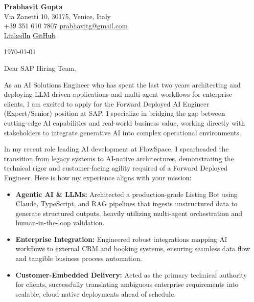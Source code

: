 \documentclass[11pt,a4paper]{article}
\begin{document}
\begin{center}
    {\huge \textbf{Prabhavit Gupta}} \\
    \vspace{4pt}
    Via Zanetti 10, 30175, Venice, Italy \\
    +39 351 610 7807 \textbar{} \href{mailto:prabhavitg@gmail.com}{prabhavitg@gmail.com} \\
    \href{https://www.linkedin.com/in/prabhavit/}{LinkedIn} \textbar{} \href{https://github.com/prab-gupta}{GitHub}
\end{center}

\vspace{20pt}

\noindent \today

\vspace{10pt}

\noindent Dear SAP Hiring Team,

\vspace{10pt}

\noindent As an AI Solutions Engineer who has spent the last two years architecting and deploying LLM-driven applications and multi-agent workflows for enterprise clients, I am excited to apply for the Forward Deployed AI Engineer (Expert/Senior) position at SAP. I specialize in bridging the gap between cutting-edge AI capabilities and real-world business value, working directly with stakeholders to integrate generative AI into complex operational environments.

\noindent In my recent role leading AI development at FlowSpace, I spearheaded the transition from legacy systems to AI-native architectures, demonstrating the technical rigor and customer-facing agility required of a Forward Deployed Engineer. Here is how my experience aligns with your mission:

\begin{itemize}[leftmargin=*]
    \item \textbf{Agentic AI \& LLMs:} Architected a production-grade Listing Bot using Claude, TypeScript, and RAG pipelines that ingests unstructured data to generate structured outputs, heavily utilizing multi-agent orchestration and human-in-the-loop validation.
    \item \textbf{Enterprise Integration:} Engineered robust integrations mapping AI workflows to external CRM and booking systems, ensuring seamless data flow and tangible business process automation.
    \item \textbf{Customer-Embedded Delivery:} Acted as the primary technical authority for clients, successfully translating ambiguous enterprise requirements into scalable, cloud-native deployments ahead of schedule.
\end{itemize}
\end{document}
